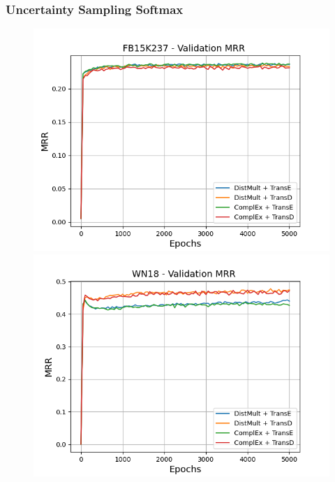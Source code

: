 \subsubsection{Uncertainty Sampling Softmax}


\begin{figure}
    \centering
    \begin{minipage}{.3\textwidth}
      \centering
      \includegraphics[width=\linewidth]{figures/results/gan_train/not_pretrained/uncertainty/max_distribution/entropy/fb15k237/5k_epochs/uncertainty_fb15k237_mrrs.png}
    \end{minipage}%
    \begin{minipage}{.3\textwidth}
      \centering
      \includegraphics[width=\linewidth]{figures/results/gan_train/not_pretrained/uncertainty/max_distribution/entropy/wn18/5k_epochs/uncertainty_wn18_mrrs.png}

\end{minipage}
\end{figure}
